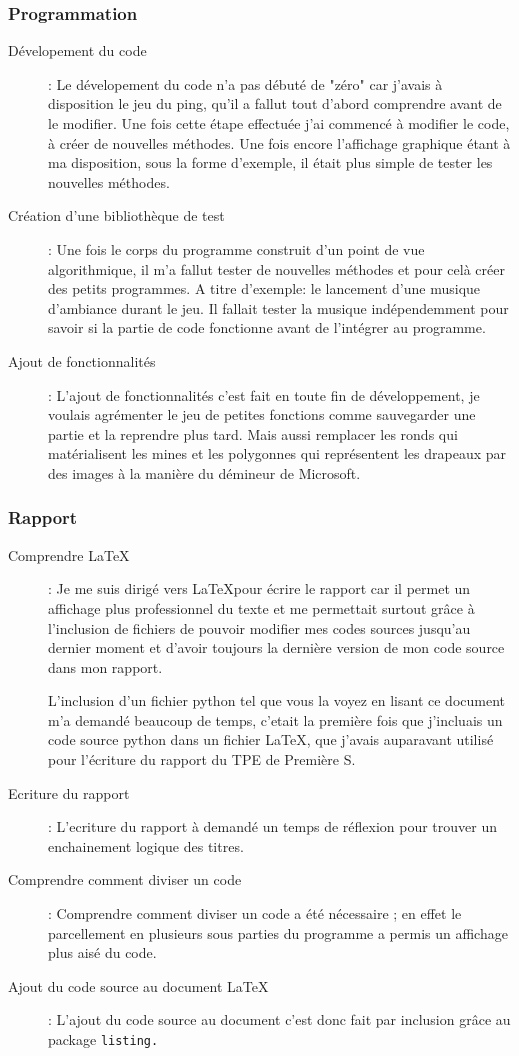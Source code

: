 \documentclass[a4paper,11pt]{article}
\newcommand{\ml}[0]{\par\noindent}
\begin{document}
\subsubsection{Programmation}
\begin{description}
 \item [Dévelopement du code] :  Le dévelopement du code n'a pas débuté de
"zéro" car j'avais à disposition le jeu du ping, qu'il a fallut tout d'abord
comprendre avant de le modifier.
 Une fois cette étape effectuée j'ai commencé à modifier le code, à créer de
nouvelles méthodes. Une fois encore l'affichage graphique étant à ma disposition,
sous la forme d'exemple, il 
 était plus simple de tester les nouvelles méthodes.
 \item [Création d'une bibliothèque de test] :  Une fois le corps du programme
construit d'un point de vue algorithmique, il m'a fallut tester de nouvelles méthodes
et pour celà créer des petits programmes. A titre d'exemple: 
le lancement d'une musique d'ambiance durant le jeu. Il fallait
tester la musique indépendemment pour savoir si la partie de code
fonctionne avant de l'intégrer au programme.
 \item [Ajout de fonctionnalités] :  L'ajout de fonctionnalités c'est fait en
toute fin de développement, je voulais agrémenter le jeu de petites fonctions
comme sauvegarder une partie et la reprendre plus tard. Mais aussi remplacer les ronds qui matérialisent les mines et les
polygonnes qui représentent les drapeaux par des images à la manière du démineur
de Microsoft. 
 \end{description}
\subsubsection{Rapport}
\begin{description}
 \item [Comprendre \LaTeX] : Je me suis dirigé vers \LaTeX pour écrire le rapport car il permet un affichage plus professionnel du texte et me permettait surtout grâce à l'inclusion de fichiers
 de pouvoir modifier mes codes sources jusqu'au dernier moment et d'avoir toujours la dernière version de mon code source dans mon rapport. 
 \ml
 L'inclusion d'un fichier python tel que vous la voyez en lisant ce document m'a demandé beaucoup de temps, c'etait la première fois que j'incluais un code source python dans un fichier \LaTeX,
 que j'avais auparavant utilisé pour l'écriture du rapport du TPE de Première S.
 \item [Ecriture du rapport] :  L'ecriture du rapport à demandé un temps de réflexion pour trouver un enchainement logique des titres.
 \item [Comprendre comment diviser un code] :  Comprendre comment diviser un code a été nécessaire ; en effet le parcellement en plusieurs sous parties du programme a permis un affichage plus aisé du code.
 \item [Ajout du code source au document \LaTeX] : L'ajout du code source au document c'est donc fait par inclusion grâce au package \tt{listing}.
 \end{description}
\end{document}
